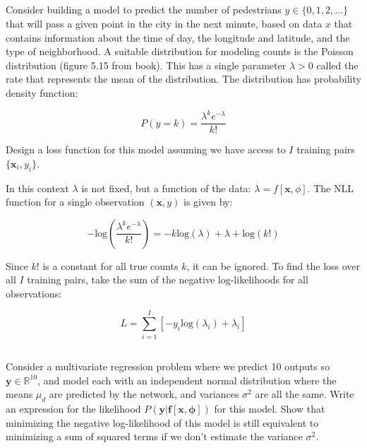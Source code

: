 \documentclass[12pt]{report}
\begin{document}
\subsection{}
\begin{mdframed}
    Consider building a model to predict the number of pedestrians $y \in \{0,1,2,\dots\}$ that will pass a given point in the city in the next minute, based on data $x$ that contains information about the time of day, the longitude and latitude, and the type of neighborhood. A suitable distribution for modeling counts is the Poisson distribution (figure 5.15 from book). This has a single parameter $\lambda > 0$ called the rate that represents the mean of the distribution. The distribution has probability density function:

    \begin{equation*}
        P(y = k) = \frac{\lambda^{k}e^{-\lambda}}{k!}
    \end{equation*}

    Design a loss function for this model assuming we have access to $I$ training pairs $\{\mathbf{x}_{i},y_{i}\}$.
\end{mdframed}

In this context $\lambda$ is not fixed, but a function of the data: $\lambda = f[\mathbf{x}, \phi]$. The NLL function for a single observation $(\mathbf{x}, y)$ is given by:

\begin{equation*}
    -\text{log}\left(\frac{\lambda^{k}e^{-\lambda}}{k!}\right) = -k\text{log}(\lambda) + \lambda + \text{log}(k!)
\end{equation*}

Since $k!$ is a constant for all true counts $k$, it can be ignored. To find the loss over all $I$ training pairs, take the sum of the negative log-likelihoods for all observations:

\begin{equation*}
    L = \sum^{I}_{i=1}[-y_{i}\text{log}(\lambda_{i}) + \lambda_{i}]
\end{equation*}

\subsection{}
\begin{mdframed}
    Consider a multivariate regression problem where we predict 10 outputs so $\mathbf{y} \in \mathbb{R}^{10}$, and model each with an independent normal distribution where the means $\mu_{d}$ are predicted by the network, and variances $\sigma^{2}$ are all the same. Write an expression for the likelihood $P(\mathbf{y}|\mathbf{f}[\mathbf{x},\boldsymbol{\phi}])$ for this model. Show that minimizing the negative log-likelihood of this model is still equivalent to minimizing a sum of squared terms if we don’t estimate the variance $\sigma^{2}$.
\end{mdframed}
\end{document}
